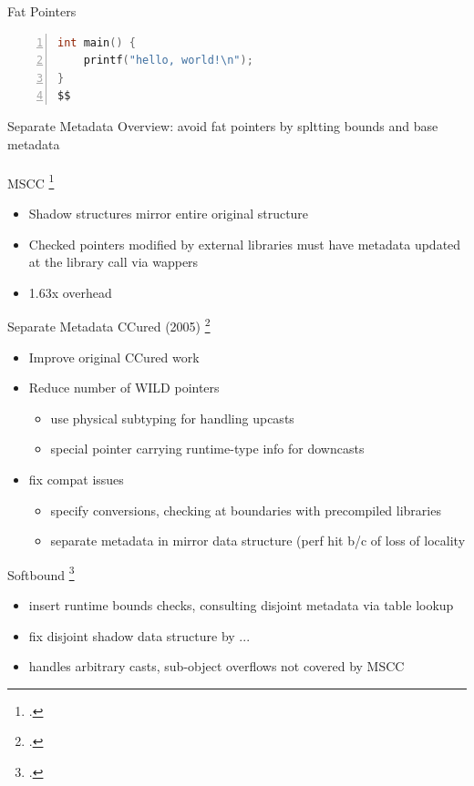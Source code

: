 \documentclass[aspectratio=169]{beamer}
\begin{document}
\begin{frame}[fragile]{Fat Pointers}
       \begin{lstlisting}[language=C,numbers=left,mathescape,basicstyle={\footnotesize\ttfamily}]
int main() {
    printf("hello, world!\n");
}
$$
        \end{lstlisting}
\end{frame}


\begin{frame}[fragile]{Separate Metadata}
Overview: avoid fat pointers by spltting bounds and base metadata
\\
\\
MSCC \footcite{xu_efficient_2004}
    \begin{itemize}
        \item Shadow structures mirror entire original structure
        \item Checked pointers modified by external libraries must have metadata updated at the library call via wappers
        \item 1.63x overhead
    \end{itemize}
\end{frame}

\begin{frame}{Separate Metadata}
CCured (2005) \footcite{necula_ccured:_2005}
    \begin{itemize}
        \item Improve original CCured work
        \item Reduce number of WILD pointers
            \begin{itemize}
                \item use physical subtyping for handling upcasts
                \item special pointer carrying runtime-type info for downcasts
            \end{itemize}
        \item fix compat issues
            \begin{itemize}
                \item specify conversions, checking at boundaries with precompiled libraries
                \item separate metadata in mirror data structure (perf hit b/c of loss of locality
            \end{itemize}
    \end{itemize}
Softbound \footcite{nagarakatte_softbound:_2009}
    \begin{itemize}
        \item {insert runtime bounds checks, consulting disjoint metadata via table lookup}
        \item {fix disjoint shadow data structure by ...}
        \item handles arbitrary casts, sub-object overflows not covered by MSCC
    \end{itemize}
\end{frame}
\end{document}

